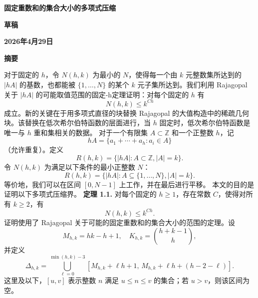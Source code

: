 \documentclass[11pt]{article}
\theoremstyle{break}
\begin{document}
\textbf{固定重数和的集合大小的多项式压缩}

\textbf{草稿}

\textbf{2026年4月29日}

\textbf{摘要}

对于固定的 $h$，令 $N(h,k)$ 为最小的 $N$，使得每一个由 $k$ 元整数集所达到的 $|hA|$ 的基数，也都能被 $\{1,\dots,N\}$ 的某个 $k$ 元子集所达到。我们利用 Rajagopal 关于 $|hA|$ 的可能取值范围的固定-h定理证明：对每个固定的 $h$ 有
\[ N(h,k) \le k^{Ch} \]
成立。新的关键在于用多项式直径的块替换 Rajagopal 的大值构造中的稀疏几何块。该替换在低次希尔伯特函数的层面进行，当 $h$ 固定时，低次希尔伯特函数是唯一与 $h$ 重和集相关的数据。
对于一个有限集 $A \subset \mathbb{Z}$ 和一个正整数 $h$，记
\[ hA = \{a_1 + \cdots + a_h : a_i \in A\} \]
（允许重复）。定义
\[ R(h,k) = \{|hA| : A \subset \mathbb{Z}, |A| = k\}. \]
令 $N(h,k)$ 为满足以下条件的最小正整数 $N$：
\[ R(h,k) = \{|hA| : A \subseteq \{1,\dots,N\}, |A| = k\}. \]
等价地，我们可以在区间 $[0,N-1]$ 上工作，并在最后进行平移。
本文的目的是证明以下多项式压缩界。
\textbf{定理 1.1.} 对每个固定的 $h\geq 1$，存在常数 $C$，使得对所有 $k\geq 2$，有
$$N(h,k) \leq k^{C h}.$$
证明使用了 Rajagopal 关于可能的固定重数和的集合大小的范围的定理。设
$$M_{h,k}=hk-h+1,\quad K_{h,k}=\binom{h+k-1}{h},$$
并定义
$$\Delta_{h,k}=\bigcup_{\ell=0}^{\min(h,k)-3}[M_{h,k}+\ell h+1,\,M_{h,k}+\ell h+(h-2-\ell)].$$
这里及以下，$[u,v]$ 表示整数 $n$ 满足 $u\leq n\leq v$ 的集合；若 $u>v$，则该区间为空。
\end{document}
